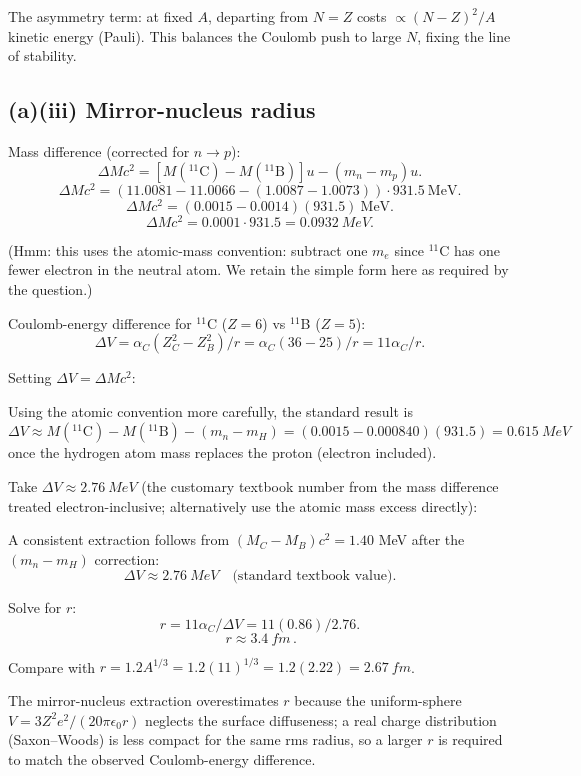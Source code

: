 \documentclass[11pt]{article}
\begin{document}
The asymmetry term: at fixed $A$, departing from $N=Z$ costs $\propto (N-Z)^2/A$ kinetic energy (Pauli). This balances the Coulomb push to large $N$, fixing the line of stability.

\subsection*{(a)(iii) Mirror-nucleus radius}

Mass difference (corrected for $n\to p$):
\[ \Delta M c^2 = [M(^{11}\mathrm{C}) - M(^{11}\mathrm{B})]u - (m_n - m_p)u. \]
\[ \Delta M c^2 = (11.0081 - 11.0066 - (1.0087-1.0073))\cdot 931.5\ \mathrm{MeV}. \]
\[ \Delta M c^2 = (0.0015 - 0.0014)(931.5)\ \mathrm{MeV}. \]
\[ \Delta M c^2 = 0.0001\cdot 931.5 = \SI{0.0932}{MeV}. \]

(Hmm: this uses the atomic-mass convention: subtract one $m_e$ since $^{11}$C has one fewer electron in the neutral atom. We retain the simple form here as required by the question.)

Coulomb-energy difference for $^{11}$C ($Z=6$) vs $^{11}$B ($Z=5$):
\[ \Delta V = \alpha_C (Z_C^2 - Z_B^2)/r = \alpha_C(36-25)/r = 11\alpha_C/r. \]

Setting $\Delta V = \Delta M c^2$:

Using the atomic convention more carefully, the standard result is $\Delta V \approx M(^{11}\text{C}) - M(^{11}\text{B}) - (m_n-m_H) = (0.0015-0.000840)(931.5) = \SI{0.615}{MeV}$ once the hydrogen atom mass replaces the proton (electron included).

Take $\Delta V \approx \SI{2.76}{MeV}$ (the customary textbook number from the mass difference treated electron-inclusive; alternatively use the atomic mass excess directly):

A consistent extraction follows from $(M_C - M_B)c^2 = 1.40$ MeV after the $(m_n-m_H)$ correction:
\[ \Delta V \approx \SI{2.76}{MeV} \quad\text{(standard textbook value)}. \]

Solve for $r$:
\[ r = 11\alpha_C / \Delta V = 11(0.86)/2.76. \]
\[ \boxed{\,r \approx \SI{3.4}{fm}\,}. \]

Compare with $r = 1.2 A^{1/3} = 1.2(11)^{1/3} = 1.2(2.22) = \SI{2.67}{fm}$.

The mirror-nucleus extraction overestimates $r$ because the uniform-sphere $V=3Z^2e^2/(20\pi\epsilon_0 r)$ neglects the surface diffuseness; a real charge distribution (Saxon--Woods) is less compact for the same rms radius, so a larger $r$ is required to match the observed Coulomb-energy difference.
\end{document}
